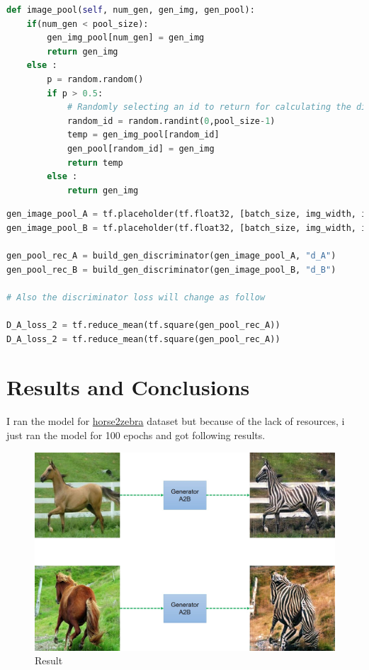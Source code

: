 \documentclass[peerreview]{IEEEtran}
\begin{document}
\begin{lstlisting}[language=Python]
def image_pool(self, num_gen, gen_img, gen_pool):
    if(num_gen < pool_size):
        gen_img_pool[num_gen] = gen_img
        return gen_img
    else :
        p = random.random()
        if p > 0.5:
            # Randomly selecting an id to return for calculating the discriminator loss
            random_id = random.randint(0,pool_size-1)
            temp = gen_img_pool[random_id]
            gen_pool[random_id] = gen_img
            return temp
        else :
            return gen_img
\end{lstlisting}

\begin{lstlisting}[language=Python]
gen_image_pool_A = tf.placeholder(tf.float32, [batch_size, img_width, img_height, img_layer], name="gen_img_pool_A")
gen_image_pool_B = tf.placeholder(tf.float32, [batch_size, img_width, img_height, img_layer], name="gen_img_pool_B")

gen_pool_rec_A = build_gen_discriminator(gen_image_pool_A, "d_A")
gen_pool_rec_B = build_gen_discriminator(gen_image_pool_B, "d_B")

# Also the discriminator loss will change as follow

D_A_loss_2 = tf.reduce_mean(tf.square(gen_pool_rec_A))
D_A_loss_2 = tf.reduce_mean(tf.square(gen_pool_rec_A))
\end{lstlisting}

\section{Results and Conclusions}
I ran the model for \href{https://people.eecs.berkeley.edu/~taesung_park/CycleGAN/datasets/horse2zebra.zip}{horse2zebra} dataset but because of the lack of resources, i just ran the model for 100 epochs and got following results.

\begin{figure}[H]
    \centering
    \includegraphics[width=0.8\columnwidth]{Results.jpg}
    \caption{Result}
    \label{fig:s=result}
\end{figure}
\end{document}
